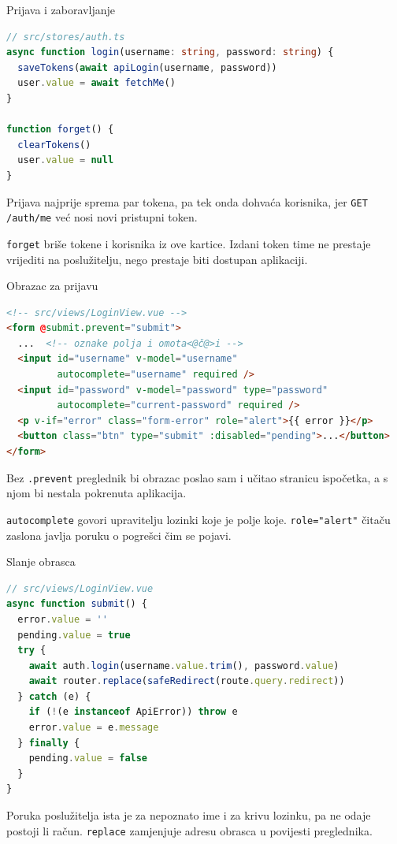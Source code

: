 \begin{frame}[fragile]{Prijava i zaboravljanje}
\begin{lstlisting}[language=typescript]
// src/stores/auth.ts
async function login(username: string, password: string) {
  saveTokens(await apiLogin(username, password))
  user.value = await fetchMe()
}

function forget() {
  clearTokens()
  user.value = null
}
\end{lstlisting}

\vspace{0.5em}
Prijava najprije sprema par tokena, pa tek onda dohvaća korisnika, jer \texttt{GET /auth/me} već nosi novi pristupni token.

\vspace{0.5em}
\texttt{forget} briše tokene i korisnika iz ove kartice. Izdani token time ne prestaje vrijediti na poslužitelju, nego prestaje biti dostupan aplikaciji.
\end{frame}

\begin{frame}[fragile]{Obrazac za prijavu}
\begin{lstlisting}[language=html]
<!-- src/views/LoginView.vue -->
<form @submit.prevent="submit">
  ...  <!-- oznake polja i omota<@č@>i -->
  <input id="username" v-model="username"
         autocomplete="username" required />
  <input id="password" v-model="password" type="password"
         autocomplete="current-password" required />
  <p v-if="error" class="form-error" role="alert">{{ error }}</p>
  <button class="btn" type="submit" :disabled="pending">...</button>
</form>
\end{lstlisting}

\vspace{0.3em}
Bez \texttt{.prevent} preglednik bi obrazac poslao sam i učitao stranicu ispočetka, a s njom bi nestala pokrenuta aplikacija.

\vspace{0.3em}
\texttt{autocomplete} govori upravitelju lozinki koje je polje koje. \texttt{role="alert"} čitaču zaslona javlja poruku o pogrešci čim se pojavi.
\end{frame}

\begin{frame}[fragile]{Slanje obrasca}
\begin{lstlisting}[language=typescript]
// src/views/LoginView.vue
async function submit() {
  error.value = ''
  pending.value = true
  try {
    await auth.login(username.value.trim(), password.value)
    await router.replace(safeRedirect(route.query.redirect))
  } catch (e) {
    if (!(e instanceof ApiError)) throw e
    error.value = e.message
  } finally {
    pending.value = false
  }
}
\end{lstlisting}

\vspace{0.2em}
Poruka poslužitelja ista je za nepoznato ime i za krivu lozinku, pa ne odaje postoji li račun. \texttt{replace} zamjenjuje adresu obrasca u povijesti preglednika.
\end{frame}

